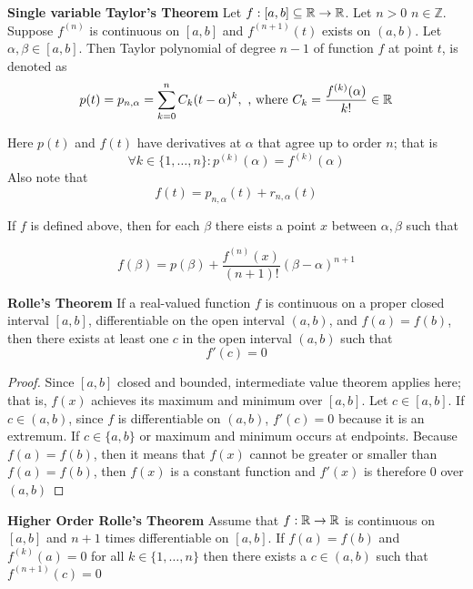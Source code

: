 \documentclass[11pt]{article}
\begin{document}
\begin{defn}
  \label{One-Var Taylor Series} \textbf{Single variable Taylor's Theorem} Let $f: [a,b]\subseteq \mathbb{R} \rightarrow \mathbb{R}$. Let $n>0$ $n\in \mathbb{Z}$. Suppose $f^{(n)}$ is continuous on $[a,b]$ and $f^{(n+1)}(t)$ exists on $(a,b)$. Let $\alpha, \beta \in [a,b]$. Then Taylor polynomial of degree $n-1$ of function $f$ at point $t$, is denoted as
  \[
    p(t) = p_{n, \alpha} = \sum_{k=0}^{n} C_k (t-\alpha)^k, \text{ , where } C_k = \frac{f^{(k)}(\alpha)}{k!} \in\mathbb{R}
  \]
  \begin{rem}
    Here $p(t)$ and $f(t)$ have derivatives at $\alpha$ that agree up to order $n$; that is
    \[
      \forall k\in \{1,\dots, n\}: p^{(k)}(\alpha) = f^{(k)}(\alpha)
    \]
    Also note that
    \[
      f(t) = p_{n, \alpha}(t) + r_{n, \alpha} (t)
    \]
  \end{rem}
  \noindent If $f$ is defined above, then for each $\beta$ there eists a point $x$ between $\alpha,\beta$ such that

   \[
    f(\beta) = p(\beta) + \frac{f^{(n)}(x)}{(n+1)!} (\beta - \alpha)^{n+1}
   \]

\end{defn}



\begin{theorem}
  \textbf{Rolle's Theorem} If a real-valued function $f$ is continuous on a proper closed interval $[a, b]$, differentiable on the open interval $(a, b)$, and $f(a) = f(b)$, then there exists at least one $c$ in the open interval $(a, b)$ such that
  \[
    f'(c) = 0
  \]
  \begin{proof}
    Since $[a, b]$ closed and bounded, intermediate value theorem applies here; that is, $f(x)$ achieves its maximum and minimum over $[a,b]$. Let $c\in[a,b]$. If $c\in(a,b)$, since $f$ is differentiable on $(a,b)$, $f'(c) = 0$ because it is an extremum. If $c\in \{ a, b\}$ or maximum and minimum occurs at endpoints. Because $f(a) = f(b)$, then it means that $f(x)$ cannot be greater or smaller than $f(a) = f(b)$, then $f(x)$ is a constant function and $f'(x)$ is therefore 0 over $(a,b)$
  \end{proof}
\end{theorem}


\begin{theorem}
  \label{Higher Order Rolle's Theorem} \textbf{Higher Order Rolle's Theorem} Assume that $f: \mathbb{R} \rightarrow \mathbb{R}$ is continuous on $[a,b]$ and $n+1$ times differentiable on $[a,b]$. If $f(a) = f(b)$ and $f^{(k)}(a) = 0$ for all $k\in \{ 1, \dots, n\}$ then there exists a $c\in (a,b)$ such that $f^{(n+1)}(c) = 0$
\end{theorem}
\end{document}
